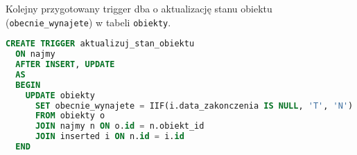 Kolejny przygotowany trigger dba o aktualizację stanu obiektu (\texttt{obecnie\_wynajete}) w tabeli \texttt{obiekty}.

\begin{lstlisting}[language=SQL, caption={Skrypt tworzący trigger \texttt{aktualizuj\_stan\_obiektu}}, label={lst:trigger-aktualizuj_stan_obiektu}]
CREATE TRIGGER aktualizuj_stan_obiektu
  ON najmy
  AFTER INSERT, UPDATE
  AS
  BEGIN
    UPDATE obiekty
      SET obecnie_wynajete = IIF(i.data_zakonczenia IS NULL, 'T', 'N')
      FROM obiekty o
      JOIN najmy n ON o.id = n.obiekt_id
      JOIN inserted i ON n.id = i.id
  END
\end{lstlisting}